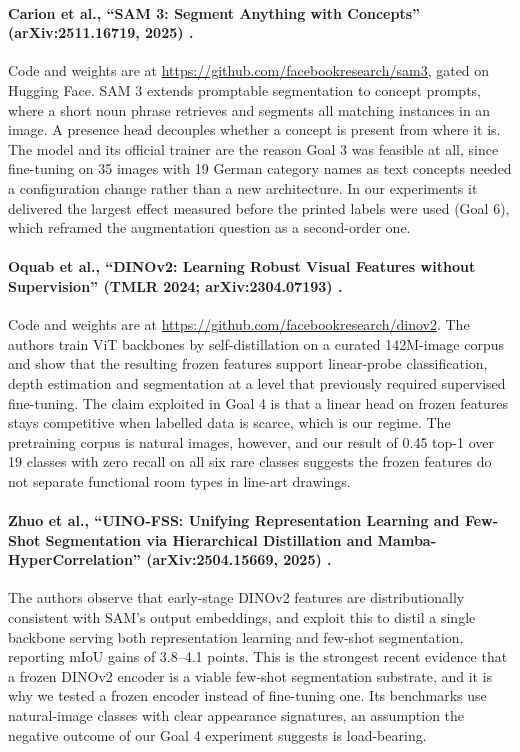 \paragraph{Carion et al., ``SAM 3: Segment Anything with Concepts''
(arXiv:2511.16719, 2025) \cite{carion2025sam3}.} Code and weights are at
\url{https://github.com/facebookresearch/sam3}, gated on Hugging Face. SAM 3
extends promptable segmentation to concept prompts, where a short noun phrase
retrieves and segments all matching instances in an image. A presence head
decouples whether a concept is present from where it is. The model and its
official trainer are the reason Goal 3 was feasible at all, since fine-tuning on
35 images with 19 German category names as text concepts needed a configuration
change rather than a new architecture. In our experiments it delivered the
largest effect measured before the printed labels were used (Goal 6), which reframed the augmentation question
as a second-order one.

\paragraph{Oquab et al., ``DINOv2: Learning Robust Visual Features without
Supervision'' (TMLR 2024; arXiv:2304.07193) \cite{oquab2024dinov2}.} Code and
weights are at \url{https://github.com/facebookresearch/dinov2}. The authors
train ViT backbones by self-distillation on a curated 142M-image corpus and show
that the resulting frozen features support linear-probe classification, depth
estimation and segmentation at a level that previously required supervised
fine-tuning. The claim exploited in Goal 4 is that a linear head on frozen
features stays competitive when labelled data is scarce, which is our regime.
The pretraining corpus is natural images, however, and our result of 0.45 top-1
over 19 classes with zero recall on all six rare classes suggests the frozen
features do not separate functional room types in line-art drawings.

\paragraph{Zhuo et al., ``UINO-FSS: Unifying Representation Learning and
Few-Shot Segmentation via Hierarchical Distillation and Mamba-HyperCorrelation''
(arXiv:2504.15669, 2025) \cite{zhuo2025uinofss}.} The authors observe that
early-stage DINOv2 features are distributionally consistent with SAM's output
embeddings, and exploit this to distil a single backbone serving both
representation learning and few-shot segmentation, reporting mIoU gains of
3.8--4.1 points. This is the strongest recent evidence that a frozen DINOv2
encoder is a viable few-shot segmentation substrate, and it is why we tested a
frozen encoder instead of fine-tuning one. Its benchmarks use natural-image
classes with clear appearance signatures, an assumption the negative outcome of
our Goal 4 experiment suggests is load-bearing.

